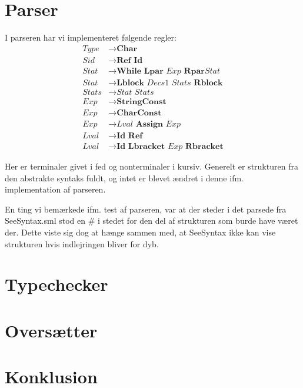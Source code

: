 \documentclass[a2paper, 10pt]{article}
\newcommand{\ra}[0]{\rightarrow}
\begin{document}
\section{Parser}
I parseren har vi implementeret følgende regler:
\begin{align*}
    \textit{Type}  & \ra \textbf{Char} \\
    \textit{Sid}   & \ra \textbf{Ref Id} \\
    \textit{Stat}  & \ra \textbf{While Lpar} \textit{ Exp } \textbf{Rpar}
                         \textit{Stat} \\
    \textit{Stat}  & \ra \textbf{Lblock} \textit{ Decs1 Stats } \textbf{Rblock} \\
    \textit{Stats} & \ra \textit{Stat Stats} \\
    \textit{Exp}   & \ra \textbf{StringConst} \\
    \textit{Exp}   & \ra \textbf{CharConst} \\
    \textit{Exp}   & \ra \textit{Lval} \textbf{ Assign } \textit{Exp} \\
    \textit{Lval}  & \ra \textbf{Id Ref} \\
    \textit{Lval}  & \ra \textbf{Id Lbracket} \textit{ Exp } \textbf{Rbracket}
\end{align*}

Her er terminaler givet i fed og nonterminaler i kursiv. Generelt er strukturen
fra den abstrakte syntaks fuldt, og intet er blevet ændret i denne ifm.
implementation af parseren.


En ting vi bemærkede ifm. test af parseren, var at der steder i det parsede fra
SeeSyntax.sml stod en # i stedet for den del af strukturen som burde have været
der. Dette viste sig dog at hænge sammen med, at SeeSyntax ikke kan vise
strukturen hvis indlejringen bliver for dyb.

\section{Typechecker}

\section{Oversætter}

\section{Konklusion}
\end{document}
